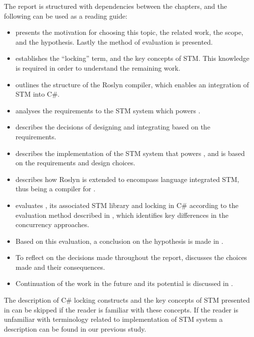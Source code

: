 The report is structured with dependencies between the chapters, and the following can be used as a reading guide:
\begin{itemize}
	\item {} presents the motivation for choosing this topic, the related work, the scope, and the hypothesis. Lastly the method of evaluation is presented.
	\item {} establishes the ``locking'' term, and the key concepts of \ac{STM}. This knowledge is required in order to understand the remaining work.
	\item {} outlines the structure of the Roslyn compiler, which enables an integration of \ac{STM} into C\#.
	\item {} analyses the requirements to the \ac{STM} system which powers \stmname.
	\item {} describes the decisions of designing and integrating \stmname based on the requirements.
	\item {} describes the implementation of the \ac{STM} system that powers \stmname, and is based on the requirements and design choices.
	\item {} describes how Roslyn is extended to encompass language integrated \ac{STM}, thus being a compiler for \stmname.
	\item {} evaluates \stmname, its associated \ac{STM} library and locking in C\# according to the evaluation method described in , which identifies key differences in the concurrency approaches.
	\item Based on this evaluation, a conclusion on the hypothesis is made in .
	 \item To reflect on the decisions made throughout the report,  discusses the choices made and their consequences.
	 \item Continuation of the work in the future and its potential is discussed in .
\end{itemize}

The description of C\# locking constructs and the key concepts of \ac{STM} presented in  can be skipped if the reader is familiar with these concepts. If the reader is unfamiliar with terminology related to implementation of \ac{STM} system a description  can be found in our previous study\cite[p. 53]{dpt907e14trending}.


